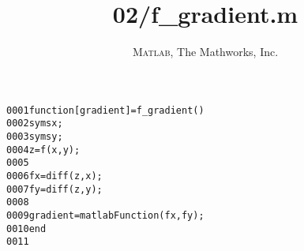 \documentclass[a4paper,10pt]{article}
\title{02/f_gradient.m}
\author{\textsc{Matlab}, The Mathworks, Inc.}
\begin{document}
\maketitle
\begin{alltt}
0001 \textcolor{keyword}{function} [ gradient ] = f\_gradient()
0002     syms x;
0003     syms y;
0004     z = f(x, y);
0005 
0006     fx = diff(z, x);
0007     fy = diff(z, y);
0008 
0009     gradient = matlabFunction(fx, fy);
0010 \textcolor{keyword}{end}
0011 
\end{alltt}
\end{document}
